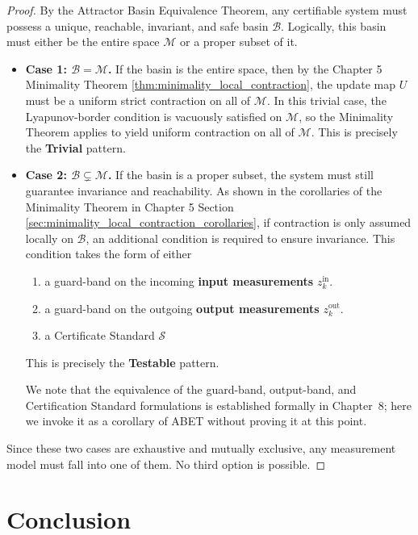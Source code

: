 \documentclass[12pt]{article}
\theoremstyle{definition}
\theoremstyle{plain}
\begin{document}
\begin{proof}
By the Attractor Basin Equivalence Theorem, any certifiable system must possess a unique, reachable, invariant, and safe basin $\mathcal{B}$. Logically, this basin must either be the entire space $\mathcal{M}$ or a proper subset of it.
\begin{itemize}
    \item \textbf{Case 1: $\mathcal{B}=\mathcal{M}$.} If the basin is the entire space, then by the Chapter 5 Minimality Theorem \ref{thm:minimality_local_contraction}, the update map $U$ must be a uniform strict contraction on all of $\mathcal{M}$. In this trivial case, the Lyapunov-border condition is vacuously satisfied on $\mathcal{M}$, so the Minimality Theorem applies to yield uniform contraction on all of $\mathcal{M}$. This is precisely the \textbf{Trivial} pattern.
    \item \textbf{Case 2: $\mathcal{B} \subsetneq \mathcal{M}$.} If the basin is a proper subset, the system must still guarantee invariance and reachability. As shown in the corollaries of the Minimality Theorem in Chapter 5 Section \ref{sec:minimality_local_contraction_corollaries}, if contraction is only assumed locally on $\mathcal{B}$, an additional condition is required to ensure invariance. This condition takes the form of either
    \begin{enumerate}
        \item a guard-band on the incoming \textbf{input measurements} $z^{\text{in}}_k$. 
        \item a guard-band on the outgoing \textbf{output measurements} $z^{\text{out}}_k$. 
        \item a Certificate Standard $\mathcal{S}$
    \end{enumerate}
    This is precisely the \textbf{Testable} 
    pattern.
    
    We note that the equivalence of the guard-band, output-band, and Certification Standard formulations is established formally in Chapter~8; here we invoke it as a corollary of ABET without proving it at this point.

\end{itemize}
Since these two cases are exhaustive and mutually exclusive, any measurement model must fall into one of them. No third option is possible.
\end{proof}

\section*{Conclusion}
\end{document}
